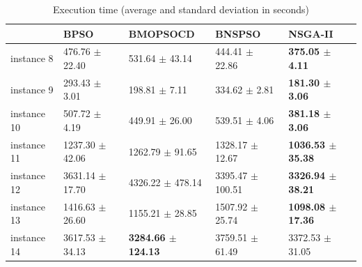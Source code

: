 \documentclass[10pt,journal,compsoc]{IEEEtran}
\begin{document}
\begin{table}[th]
{\begin{subtable}{.6\linewidth}
\centering
\begin{tabular}{lllll}
\hline
\multicolumn{1}{l|}{}            & BPSO              & BMOPSOCD           & BNSPSO             & NSGA-II           \\ \hline
\multicolumn{1}{l|}{instance 8}  & 476.76 $\pm$ 22.40  & 531.64 $\pm$ 43.14   & 444.41 $\pm$ 22.86   & \textbf{375.05 $\pm$ 4.11}   \\ 
\multicolumn{1}{l|}{instance 9}  & 293.43 $\pm$ 3.01   & 198.81 $\pm$ 7.11    & 334.62 $\pm$ 2.81    & \textbf{181.30 $\pm$ 3.06}   \\
\multicolumn{1}{l|}{instance 10} & 507.72 $\pm$ 4.19   & 449.91 $\pm$ 26.00   & 539.51 $\pm$ 4.06    & \textbf{381.18  $\pm$ 3.06}  \\
\multicolumn{1}{l|}{instance 11} & 1237.30 $\pm$ 42.06 & 1262.79 $\pm$ 91.65  & 1328.17 $\pm$ 12.67  & \textbf{1036.53 $\pm$ 35.38} \\
\multicolumn{1}{l|}{instance 12} & 3631.14 $\pm$ 17.70 & 4326.22 $\pm$ 478.14 & 3395.47 $\pm$ 100.51 & \textbf{3326.94 $\pm$ 38.21} \\
\multicolumn{1}{l|}{instance 13} & 1416.63 $\pm$ 26.60 & 1155.21 $\pm$ 28.85  & 1507.92 $\pm$ 25.74  & \textbf{1098.08 $\pm$ 17.36} \\
\multicolumn{1}{l|}{instance 14} & 3617.53 $\pm$ 34.13 & \textbf{3284.66 $\pm$ 124.13} & 3759.51 $\pm$ 61.49  & 3372.53 $\pm$ 31.05 \\
\hline
\end{tabular}
\end{subtable}
}
\caption{Execution time (average and standard deviation in seconds)}
\label{tab:time}
\end{table}
\end{document}
